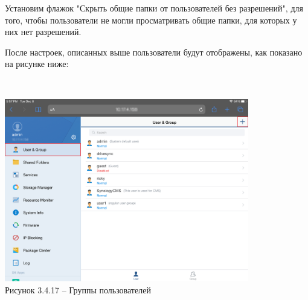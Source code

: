     Установим флажок "Скрыть общие папки от пользователей без разрешений",
    для того, чтобы пользователи не могли просматривать общие папки, для которых у них нет разрешений.

    После настроек, описанных выше пользователи будут отображены,
    как показано на рисунке ниже:

    \\
    \begin{center}
        \includegraphics[width=0.8\textwidth]{images/usergroups}\\
        Рисунок 3.4.17 – Группы пользователей
    \end{center}
    \\


